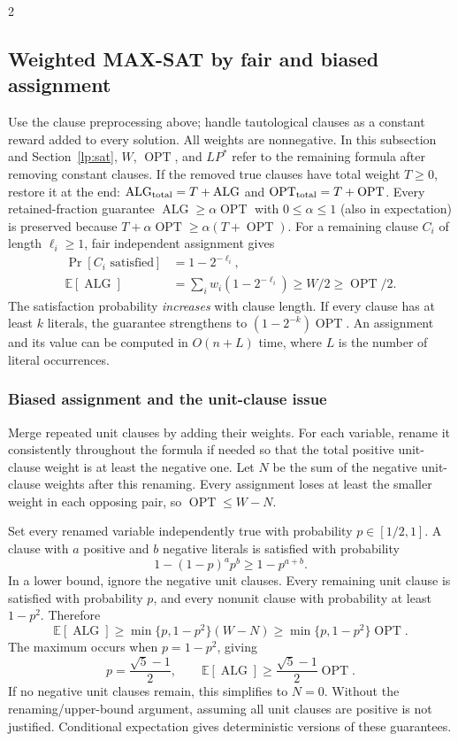 \documentclass[8pt]{extarticle}
\theoremstyle{definition}
\newcommand{\OPT}{\operatorname{OPT}}
\newcommand{\ALG}{\operatorname{ALG}}
\begin{document}
\begin{multicols*}{2}
\subsection{Weighted MAX-SAT by fair and biased assignment}\label{ra:sat}
Use the clause preprocessing above; handle tautological clauses as a constant
reward added to every solution. All weights are nonnegative. In this
subsection and Section~\ref{lp:sat}, $W$, $\OPT$, and $LP^*$ refer to the
remaining formula after removing constant clauses. If the removed true
clauses have total weight $T\ge0$, restore it at the end:
$\ALG_{\rm total}=T+\ALG$ and $\OPT_{\rm total}=T+\OPT$.
Every retained-fraction guarantee $\ALG\ge\alpha\OPT$ with $0\le\alpha\le1$
(also in expectation) is preserved because
$T+\alpha\OPT\ge\alpha(T+\OPT)$.
For a remaining
clause $C_i$ of length $\ell_i\ge1$, fair independent assignment gives
\[
\begin{aligned}
  \Pr[C_i\text{ satisfied}]&=1-2^{-\ell_i},\\
  \mathbb E[\ALG]&=\sum_iw_i(1-2^{-\ell_i})\ge W/2\ge\OPT/2.
\end{aligned}
\]
The satisfaction probability \emph{increases} with clause length. If every
clause has at least $k$ literals, the guarantee strengthens to
$(1-2^{-k})\OPT$. An assignment and its value can be computed in $O(n+L)$
time, where $L$ is the number of literal occurrences.

\subsubsection*{Biased assignment and the unit-clause issue}
Merge repeated unit clauses by adding their weights. For each variable,
rename it consistently throughout the formula if needed so that the total
positive unit-clause weight is at least the negative one. Let $N$ be the sum
of the negative unit-clause weights after this renaming. Every assignment
loses at least the smaller weight in each opposing pair, so
$\OPT\le W-N$.

Set every renamed variable independently true with probability
$p\in[1/2,1]$. A clause with $a$ positive and $b$ negative literals is
satisfied with probability
\[
  1-(1-p)^a p^b\ge1-p^{a+b}.
\]
In a lower bound, ignore the negative unit clauses. Every remaining unit
clause is satisfied with probability $p$, and every nonunit clause with
probability at least $1-p^2$. Therefore
\[
  \mathbb E[\ALG]\ge\min\{p,1-p^2\}(W-N)
    \ge\min\{p,1-p^2\}\OPT.
\]
The maximum occurs when $p=1-p^2$, giving
\[
  p=\frac{\sqrt5-1}{2},\qquad
  \mathbb E[\ALG]\ge\frac{\sqrt5-1}{2}\OPT.
\]
If no negative unit clauses remain, this simplifies to $N=0$.
Without the renaming/upper-bound argument, assuming all unit clauses are
positive is not justified. Conditional expectation gives deterministic
versions of these guarantees.


\end{multicols*}
\end{document}
